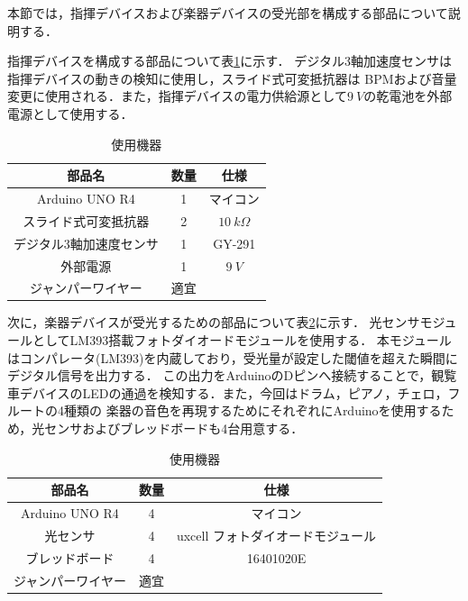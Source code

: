 \documentclass[lualatex,book,paper=a4paper,jafontsize=11.5pt,jafontscale=1.05,openany]{jlreq}
\begin{document}
本節では，指揮デバイスおよび楽器デバイスの受光部を構成する部品について説明する．

指揮デバイスを構成する部品について表\ref{table:siki}に示す．
デジタル3軸加速度センサは指揮デバイスの動きの検知に使用し，スライド式可変抵抗器は
BPMおよび音量変更に使用される．また，指揮デバイスの電力供給源として$\SI{9}{V}$の乾電池を外部電源として使用する．

\begin{table}[h]
  \centering
  \caption{使用機器}
  \label{table:siki}
  \begin{tabular}{c|c|c}
  
  \hline
  部品名 & 数量 & 仕様 \\\hline\hline
  Arduino UNO R4 & 1 & マイコン\\\hline
  スライド式可変抵抗器 & 2 & $\SI{10}{kΩ}$\\\hline
  デジタル3軸加速度センサ & 1 & GY-291\\\hline
  外部電源 & 1 & $\SI{9}{V}$\\\hline
  ジャンパーワイヤー & 適宜 & \\\hline

  \end{tabular}
\end{table}

次に，楽器デバイスが受光するための部品について表\ref{table:ota}に示す．
光センサモジュールとしてLM393搭載フォトダイオードモジュールを使用する．
本モジュールはコンパレータ(LM393)を内蔵しており，受光量が設定した閾値を超えた瞬間にデジタル信号を出力する．
この出力をArduinoのDピンへ接続することで，観覧車デバイスのLEDの通過を検知する．また，今回はドラム，ピアノ，チェロ，フルートの4種類の
楽器の音色を再現するためにそれぞれにArduinoを使用するため，光センサおよびブレッドボードも4台用意する．




\begin{table}[h]
        \centering
        \caption{使用機器}
        \label{table:ota}
        \begin{tabular}{c|c|c}
        
        \hline
        部品名 & 数量 & 仕様 \\\hline\hline
        Arduino UNO R4 & 4 & マイコン\\\hline
        光センサ & 4 & uxcell フォトダイオードモジュール\\\hline
        ブレッドボード & 4 & 16401020E\\\hline
        ジャンパーワイヤー & 適宜 & \\\hline
      
        \end{tabular}
\end{table}
\end{document}
